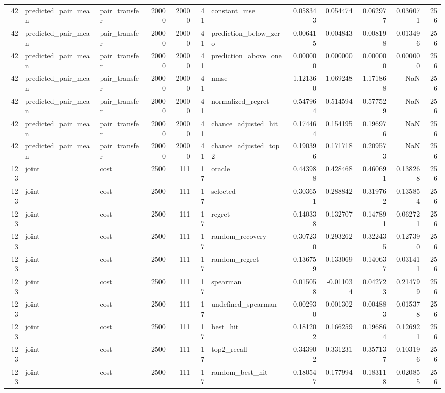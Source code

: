 \begin{tabular}{rllrrrlrrrrr}
42 & predicted_pair_mean & pair_transfer & 20000 & 20000 & 41 & constant_mse & 0.058343 & 0.054474 & 0.062977 & 0.036071 & 256 \\
42 & predicted_pair_mean & pair_transfer & 20000 & 20000 & 41 & prediction_below_zero & 0.006415 & 0.004843 & 0.008198 & 0.013496 & 256 \\
42 & predicted_pair_mean & pair_transfer & 20000 & 20000 & 41 & prediction_above_one & 0.000000 & 0.000000 & 0.000000 & 0.000000 & 256 \\
42 & predicted_pair_mean & pair_transfer & 20000 & 20000 & 41 & nmse & 1.121360 & 1.069248 & 1.171868 & NaN & 256 \\
42 & predicted_pair_mean & pair_transfer & 20000 & 20000 & 41 & normalized_regret & 0.547964 & 0.514594 & 0.577529 & NaN & 256 \\
42 & predicted_pair_mean & pair_transfer & 20000 & 20000 & 41 & chance_adjusted_hit & 0.174464 & 0.154195 & 0.196976 & NaN & 256 \\
42 & predicted_pair_mean & pair_transfer & 20000 & 20000 & 41 & chance_adjusted_top2 & 0.190396 & 0.171718 & 0.209573 & NaN & 256 \\
123 & joint & cost & 2500 & 111 & 17 & oracle & 0.443988 & 0.428468 & 0.460691 & 0.138268 & 256 \\
123 & joint & cost & 2500 & 111 & 17 & selected & 0.303651 & 0.288842 & 0.319762 & 0.135854 & 256 \\
123 & joint & cost & 2500 & 111 & 17 & regret & 0.140338 & 0.132707 & 0.147891 & 0.062721 & 256 \\
123 & joint & cost & 2500 & 111 & 17 & random_recovery & 0.307230 & 0.293262 & 0.322435 & 0.127390 & 256 \\
123 & joint & cost & 2500 & 111 & 17 & random_regret & 0.136759 & 0.133069 & 0.140637 & 0.031411 & 256 \\
123 & joint & cost & 2500 & 111 & 17 & spearman & 0.015058 & -0.011034 & 0.042723 & 0.214799 & 256 \\
123 & joint & cost & 2500 & 111 & 17 & undefined_spearman & 0.002930 & 0.001302 & 0.004883 & 0.015378 & 256 \\
123 & joint & cost & 2500 & 111 & 17 & best_hit & 0.181202 & 0.166259 & 0.196864 & 0.126921 & 256 \\
123 & joint & cost & 2500 & 111 & 17 & top2_recall & 0.343902 & 0.331231 & 0.357137 & 0.103196 & 256 \\
123 & joint & cost & 2500 & 111 & 17 & random_best_hit & 0.180547 & 0.177994 & 0.183118 & 0.020855 & 256 \\

\end{tabular}
